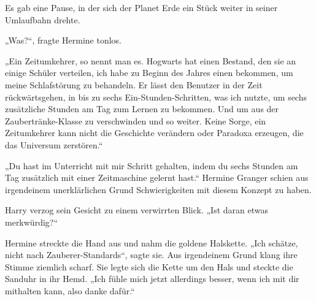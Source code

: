 Es gab eine Pause, in der sich der Planet Erde ein Stück weiter in seiner Umlaufbahn drehte.

„Was?“, fragte Hermine tonlos.

„Ein Zeitumkehrer, so nennt man es. Hogwarts hat einen Bestand, den sie an einige Schüler verteilen, ich habe zu Beginn des Jahres einen bekommen, um meine Schlafstörung zu behandeln. Er lässt den Benutzer in der Zeit rückwärtsgehen, in bis zu sechs Ein-Stunden-Schritten, was ich nutzte, um sechs zusätzliche Stunden am Tag zum Lernen zu bekommen. Und um aus der Zaubertränke-Klasse zu verschwinden und so weiter. Keine Sorge, ein Zeitumkehrer kann nicht die Geschichte verändern oder Paradoxa erzeugen, die das Universum zerstören.“

„Du hast im Unterricht mit mir Schritt gehalten, indem du sechs Stunden am Tag zusätzlich mit einer Zeitmaschine gelernt hast.“
Hermine Granger schien aus irgendeinem unerklärlichen Grund Schwierigkeiten mit diesem Konzept zu haben.

Harry verzog sein Gesicht zu einem verwirrten Blick.
„Ist daran etwas merkwürdig?“

Hermine streckte die Hand aus und nahm die goldene Halskette.
„Ich schätze, nicht nach Zauberer-Standards“, sagte sie.
Aus irgendeinem Grund klang ihre Stimme ziemlich scharf.
Sie legte sich die Kette um den Hals und steckte die Sanduhr in ihr Hemd. „Ich fühle mich jetzt allerdings besser, wenn ich mit dir mithalten kann, also danke dafür.“

